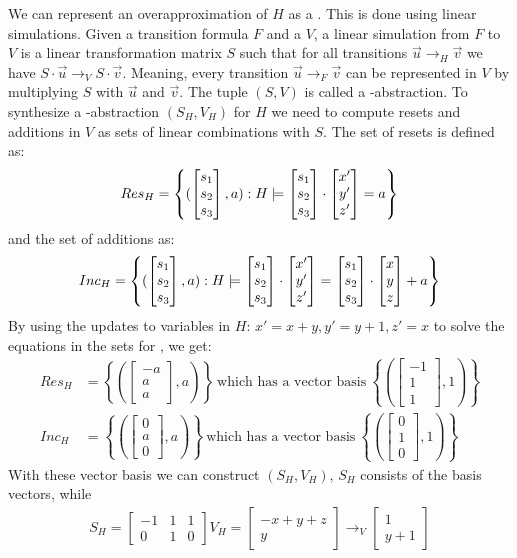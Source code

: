 We can represent an overapproximation of $H$ as a \qvasr. This is done using linear simulations. Given a transition formula $F$ and a \qvasr $V$, a linear simulation from $F$ to $V$ is a linear transformation matrix $S$ such that for all transitions $\vec{u} \rightarrow_H \vec{v}$ we have $S\cdot\vec{u} \rightarrow_V S\cdot\vec{v}$. Meaning, every transition $\vec{u} \rightarrow_F \vec{v}$ can be represented in $V$ by multiplying $S$ with $\vec{u}$ and $\vec{v}$. The tuple $(S, V)$ is called a \qvasr-abstraction. To synthesize a \qvasr-abstraction $(S_H, V_H)$ for $H$ we need to compute resets and additions in $V$ as sets of linear combinations with $S$. The set of resets is defined as: 
\begin{equation*}
	Res_H = \left\{ (\begin{bmatrix} s_1 \\ s_2 \\ s_3 \end{bmatrix}, a) : H \models \begin{bmatrix} s_1 \\ s_2 \\ s_3 \end{bmatrix} \cdot \begin{bmatrix} x' \\ y' \\ z' \end{bmatrix} = a \right\}	
\end{equation*}
 and the set of additions as:
\begin{equation*}
	Inc_H = \left\{(\begin{bmatrix} s_1 \\ s_2 \\ s_3 \end{bmatrix}, a) : H \models \begin{bmatrix} s_1 \\ s_2 \\ s_3 \end{bmatrix} \cdot \begin{bmatrix} x' \\ y' \\ z' \end{bmatrix} = \begin{bmatrix} s_1 \\ s_2 \\ s_3 \end{bmatrix} \cdot \begin{bmatrix} x \\ y \\ z \end{bmatrix} + a\right\}	
\end{equation*}
By using the updates to variables in $H$: $x' = x + y, y' = y + 1, z' = x$ to solve the equations in the sets for \s, we get:
\begin{align*}
	Res_H &= \left\{ (\begin{bmatrix} -a \\ a \\ a \end{bmatrix}, a) \right\}\ \text{which has a vector basis}\ \left\{(\begin{bmatrix} -1 \\ 1 \\ 1 \end{bmatrix}, 1)\right\} \\
	Inc_H &= \left\{ (\begin{bmatrix} 0 \\ a \\ 0 \end{bmatrix}, a) \right\}\ \text{which has a vector basis}\ \left\{(\begin{bmatrix} 0 \\ 1 \\ 0 \end{bmatrix}, 1)\right\}
\end{align*}
With these vector basis we can construct $(S_H, V_H)$, $S_H$ consists of the basis \s vectors, while
\begin{align*}
	S_H = \begin{bmatrix} -1 & 1 & 1 \\ 0 & 1 & 0 \end{bmatrix}
	V_H = \begin{bmatrix} - x + y + z \\ y \end{bmatrix} \rightarrow_V \begin{bmatrix}	1 \\ y + 1 \end{bmatrix}
\end{align*}







